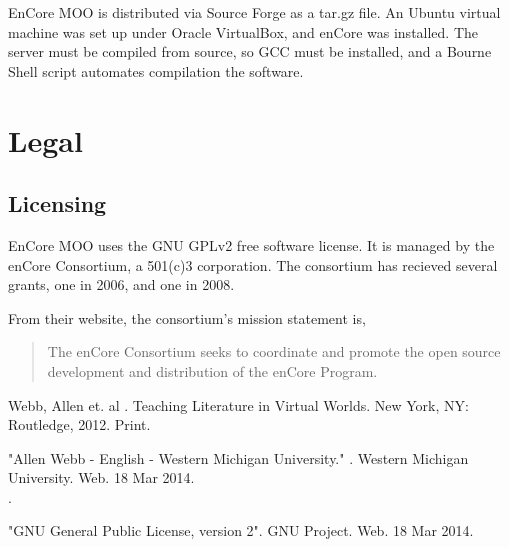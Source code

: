 \documentclass[12pt, letterpaper]{report}
\begin{document}
	\par 
	EnCore MOO is distributed via Source Forge as a tar.gz file. An Ubuntu virtual machine was set up under Oracle VirtualBox, and enCore was installed. The server must be compiled from source, so GCC must be installed, and a Bourne Shell script automates compilation the software.
    	
	\chapter{Legal}
	\section{Licensing}
	\par
	EnCore MOO uses the GNU GPLv2 free software license. It is managed by the enCore Consortium, a 501(c)3 corporation. The consortium has recieved several grants, one in 2006, and one in 2008.
	
	\par 
	From their website, the consortium's mission statement is,
	
	\begin{quotation}
	The enCore Consortium seeks to coordinate and promote the open source development and distribution of the enCore Program.
	\end{quotation}
	
	

	\printglossary
	\begin{thebibliography}{9}

 	Webb, Allen et. al . Teaching Literature in Virtual Worlds. New York, NY: Routledge, 2012. Print.

    "Allen Webb - English - Western Michigan University." . Western Michigan University. Web. 18 Mar 2014. \\
    .
    
    "GNU General Public License, version 2". GNU Project. Web. 18 Mar 2014. \\
	\end{thebibliography}

	
	
\end{document}
